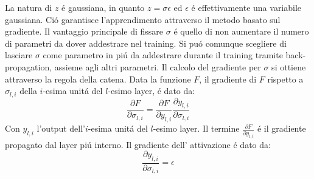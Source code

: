 \documentclass[a4paper,12pt]{report}
\begin{document}
 La natura di $z$ \'e gaussiana, in quanto $z = \sigma \epsilon$ ed $\epsilon$ \'e effettivamente una variabile gaussiana. Ci\'o garantisce l'apprendimento attraverso il metodo basato sul gradiente. Il vantaggio principale di fissare $\sigma$ \'e quello di non aumentare il numero di parametri da dover addestrare nel training. 
 Si pu\'o comunque scegliere di lasciare $\sigma$ come parametro in pi\'u da addestrare durante il training tramite back-propagation, assieme agli altri parametri. Il calcolo del gradiente per $\sigma$ si ottiene attraverso la regola della catena. Data la funzione $F$, il gradiente di $F$ rispetto a $\sigma_{l, i}$ della $i$-esima unit\'a del $l$-esimo layer, \'e dato da:
 \begin{equation} 
  \frac{\partial F}{\partial\sigma_{l, i}} =  \frac{\partial F}{\partial y_{l, i}} \frac{\partial y_{l, i}}{\partial\sigma_{l, i}}
 \end{equation} 
 Con $y_{l, i}$ l'output dell'$i$-esima unit\'a del $l$-esimo layer. Il termine $\frac{\partial F}{\partial y_{l, i}}$ \'e il gradiente propagato dal layer pi\'u interno. Il gradiente dell' attivazione \'e dato da:
 \begin{equation} 
  \frac{\partial y_{l, i}}{\partial\sigma_{l, i}} = \epsilon
 \end{equation} 
\end{document}
